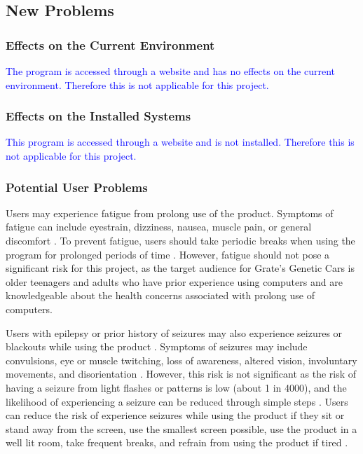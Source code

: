 \documentclass[12pt, titlepage]{article}
\begin{document}
\subsection{New Problems}

\subsubsection{Effects on the Current Environment}
\textcolor{blue}{The program is accessed through a website and has no effects on 
the current environment. Therefore this is not applicable for this project.}

\subsubsection{Effects on the Installed Systems}
\textcolor{blue}{This program is accessed through a website and is not 
installed. Therefore this is not applicable for this project.}

\subsubsection{Potential User Problems}
Users may experience fatigue from prolong use of the product. Symptoms of 
fatigue can include eyestrain, dizziness, nausea, muscle pain, or general 
discomfort \citep{nintendo}. To prevent fatigue, users should take periodic 
breaks when using the 
program for prolonged periods of time \citep{nintendo}. However, fatigue should 
not pose a 
significant risk for this project, as the target audience for Grate's Genetic 
Cars is older teenagers and adults who have prior experience using computers and 
are  knowledgeable about the health concerns associated with prolong use of 
computers.

Users with epilepsy or prior history of seizures may also experience seizures or 
blackouts while using the product \citep{nintendo}. Symptoms of seizures may 
include convulsions, 
eye or muscle twitching, loss of awareness, altered vision, involuntary 
movements, and disorientation \citep{nintendo}. However, this risk is not 
significant as the risk 
of having a seizure from light flashes or patterns is low (about 1 in 4000), and 
the likelihood of experiencing a seizure can be reduced through simple steps 
\citep{nintendo}. 
Users can reduce the risk of experience seizures while using the product if they 
sit or stand away from the screen, use the smallest screen possible, use the 
product in a well lit room, take frequent breaks, and refrain from using the 
product if tired \citep{nintendo}.
\end{document}

